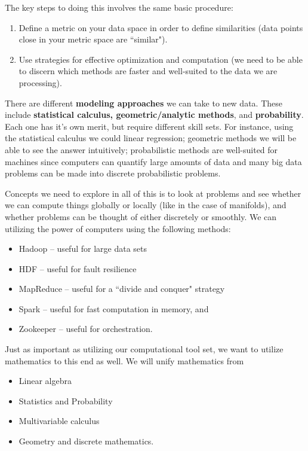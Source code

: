 \documentclass{article}
\begin{document}
\noindent The key steps to doing this involves the same basic procedure:

\begin{enumerate}
\item Define a metric on your data space in order to define similarities (data points close in your metric space are ``similar").

\item Use strategies for effective optimization and computation  (we need to be able to discern which methods are faster and well-suited to the data we are processing).
\end{enumerate}

\noindent There are different \textbf{modeling approaches} we can take to new data.  These include \textbf{statistical calculus, geometric/analytic methods}, and \textbf{probability}.  Each one has it's own merit, but require different skill sets.  For instance, using the statistical calculus we could linear regression; geometric methods we will be able to see the answer intuitively; probabilistic methods are well-suited for machines since computers can quantify large amounts of data and many big data problems can be made into discrete probabilistic problems.  

\vspace{1pc}

\noindent Concepts we need to explore in all of this is to look at problems and see whether we can compute things globally or locally (like in the case of manifolds), and whether problems can be thought of either discretely or smoothly.  We can utilizing the power of computers using the following methods:

\begin{itemize}
\item Hadoop -- useful for large data sets
\item HDF -- useful for fault resilience
\item MapReduce -- useful for a ``divide and conquer" strategy
\item Spark -- useful for fast computation in memory, and
\item Zookeeper -- useful for orchestration.
\end{itemize}

\noindent Just as important as utilizing our computational tool set, we want to utilize mathematics to this end as well.  We will unify mathematics from

\begin{itemize}
\item Linear algebra
\item Statistics and Probability
\item Multivariable calculus
\item Geometry and discrete mathematics.
\end{itemize}
\end{document}
